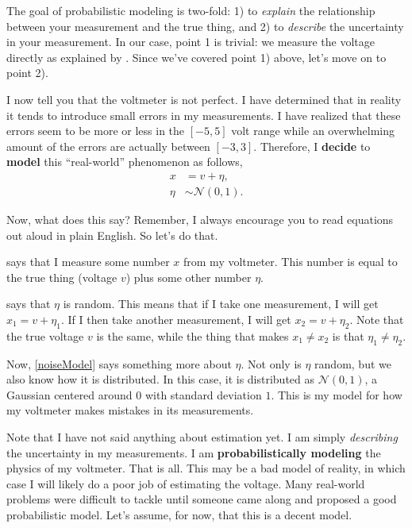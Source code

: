 \documentclass[10pt]{article}
\begin{document}
The goal of probabilistic modeling is two-fold: 1) to \emph{explain} the relationship between your measurement and the true thing, and 2) to \emph{describe} the uncertainty in your measurement. In our case, point 1 is trivial: we measure the voltage directly as explained by . Since we've covered point 1) above, let's move on to point 2).

I now tell you that the voltmeter is not perfect. I have determined that in reality it tends to introduce small errors in my measurements. I have realized that these errors seem to be more or less in the $[-5, 5]$ volt range while an overwhelming amount of the errors are actually between $[-3, 3]$. Therefore, I \textbf{decide} to \textbf{model} this ``real-world'' phenomenon as follows,
\begin{align}
	x &= v + \eta, \label{measurementModel}\\
	\eta &\sim \mathcal{N}(0,1)\label{noiseModel}.
\end{align}

Now, what does this say? Remember, I always encourage you to read equations out aloud in plain English. So let's do that.

 says that I measure some number $x$ from my voltmeter. This number is equal to the true thing (voltage $v$) plus some other number $\eta$.

 says that $\eta$ is random. This means that if I take one measurement, I will get $x_1 = v + \eta_1$. If I then take another measurement, I will get $x_2 = v + \eta_2$. Note that the true voltage $v$ is the same, while the thing that makes $x_1 \neq x_2$ is that $\eta_1 \neq \eta_2$.

Now, \cref{noiseModel} says something more about $\eta$. Not only is $\eta$ random, but we also know how it is distributed. In this case, it is distributed as $\mathcal{N}(0,1)$, a Gaussian centered around $0$ with standard deviation $1$. This is my model for how my voltmeter makes mistakes in its measurements.

Note that I have not said anything about estimation yet. I am simply \emph{describing} the uncertainty in my measurements. I am \textbf{probabilistically modeling} the physics of my voltmeter. That is all. This may be a bad model of reality, in which case I will likely do a poor job of estimating the voltage. Many real-world problems were difficult to tackle until someone came along and proposed a good probabilistic model. Let's assume, for now, that this is a decent model.
\end{document}
